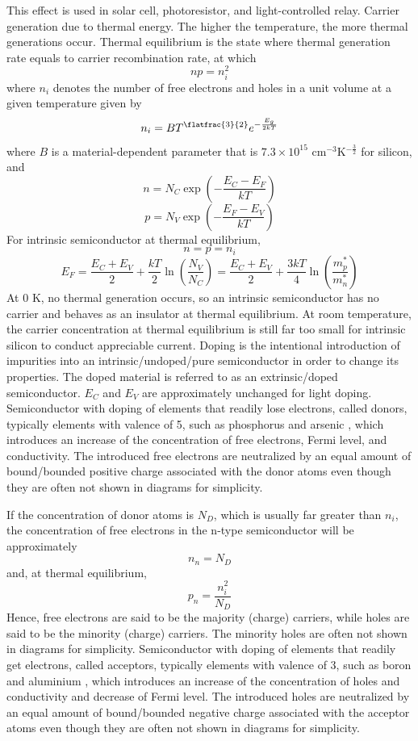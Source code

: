 \documentclass[a4paper,12pt]{article}
\begin{document}
This effect is used in solar cell, photoresistor, and light-controlled relay.
Carrier generation due to thermal energy. The higher the temperature, the more thermal generations occur.
Thermal equilibrium is the state where thermal generation rate equals to carrier recombination rate, at which
\[np=n_i^2\]
where $n_i$ denotes the number of free electrons and holes in a unit volume at a given temperature given by
\[n_i=BT^{\flatfrac{3}{2}}e^{-\frac{E_g}{2kT}}\]
where $B$ is a material-dependent parameter that is $7.3\times 10^{15}$ cm$^{-3}$K$^{-\frac{3}{2}}$ for silicon, and
\[n=N_C\exp(-\frac{E_C-E_F}{kT})\]
\[p=N_V\exp(-\frac{E_F-E_V}{kT})\]
For intrinsic semiconductor at thermal equilibrium,
\[n=p=n_i\]
\[E_F=\frac{E_C+E_V}{2}+\frac{kT}{2}\ln(\frac{N_V}{N_C})=\frac{E_C+E_V}{2}+\frac{3kT}{4}\ln(\frac{m_p^*}{m_n^*})\]
At 0 K, no thermal generation occurs, so an intrinsic semiconductor has no carrier and behaves as an insulator at thermal equilibrium. At room temperature, the carrier concentration at thermal equilibrium is still far too small for intrinsic silicon to conduct appreciable current.
Doping is the intentional introduction of impurities into an intrinsic/undoped/pure semiconductor in order to change its properties. The doped material is referred to as an extrinsic/doped semiconductor. $E_C$ and $E_V$ are approximately unchanged for light doping.
Semiconductor with doping of elements that readily lose electrons, called donors, typically elements with valence of 5, such as phosphorus  and arsenic , which introduces an increase of the concentration of free electrons, Fermi level, and conductivity. The introduced free electrons are neutralized by an equal amount of bound/bounded positive charge associated with the donor atoms even though they are often not shown in diagrams for simplicity.

If the concentration of donor atoms is $N_D$, which is usually far greater than $n_i$, the concentration of free electrons in the n-type semiconductor will be approximately
\[n_n=N_D\]
and, at thermal equilibrium,
\[p_n=\frac{n_i^2}{N_D}\]
Hence, free electrons are said to be the majority (charge) carriers, while holes are said to be the minority (charge) carriers. The minority holes are often not shown in diagrams for simplicity.
Semiconductor with doping of elements that readily get electrons, called acceptors, typically elements with valence of 3, such as boron  and aluminium , which introduces an increase of the concentration of holes and conductivity and decrease of Fermi level. The introduced holes are neutralized by an equal amount of bound/bounded negative charge associated with the acceptor atoms even though they are often not shown in diagrams for simplicity.
\end{document}
